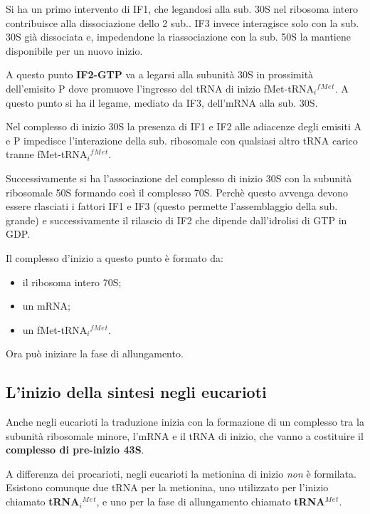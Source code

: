 \documentclass[11pt]{book}
\begin{document}
Si ha un primo intervento di IF1, che legandosi alla sub. 30S nel
ribosoma intero contribuisce alla dissociazione dello 2 sub.. IF3 invece
interagisce solo con la sub. 30S già dissociata e, impedendone la
riassociazione con la sub. 50S la mantiene disponibile per un nuovo
inizio.

A questo punto \textbf{IF2-GTP} va a legarsi alla subunità 30S in
prossimità dell'emisito P dove promuove l'ingresso del tRNA di inizio
fMet-tRNA\(_i\)\(^f\)\(^M\)\(^e\)\(^t\). A questo punto si ha il legame,
mediato da IF3, dell'mRNA alla sub. 30S.

Nel complesso di inizio 30S la presenza di IF1 e IF2 alle adiacenze
degli emisiti A e P impedisce l'interazione della sub. ribosomale con
qualsiasi altro tRNA carico tranne
fMet-tRNA\(_i\)\(^f\)\(^M\)\(^e\)\(^t\).

Successivamente si ha l'associazione del complesso di inizio 30S con la
subunità ribosomale 50S formando così il complesso 70S. Perchè questo
avvenga devono essere rlasciati i fattori IF1 e IF3 (questo permette
l'assemblaggio della sub. grande) e successivamente il rilascio di IF2
che dipende dall'idrolisi di GTP in GDP.

Il complesso d'inizio a questo punto è formato da:

\begin{itemize}
\itemsep1pt\parskip0pt
\item
  il ribosoma intero 70S;
\item
  un mRNA;
\item
  un fMet-tRNA\(_i\)\(^f\)\(^M\)\(^e\)\(^t\).
\end{itemize}

Ora può iniziare la fase di allungamento.

\subsection{L'inizio della sintesi negli
eucarioti}\label{linizio-della-sintesi-negli-eucarioti}

Anche negli eucarioti la traduzione inizia con la formazione di un
complesso tra la subunità ribosomale minore, l'mRNA e il tRNA di inizio,
che vanno a costituire il \textbf{complesso di pre-inizio 43S}.

A differenza dei procarioti, negli eucarioti la metionina di inizio
\emph{non} è formilata. Esistono comunque due tRNA per la metionina, uno
utilizzato per l'inizio chiamato \textbf{tRNA\(_i\)\(^M\)\(^e\)\(^t\)},
e uno per la fase di allungamento chiamato
\textbf{tRNA\(^M\)\(^e\)\(^t\)}.
\end{document}
